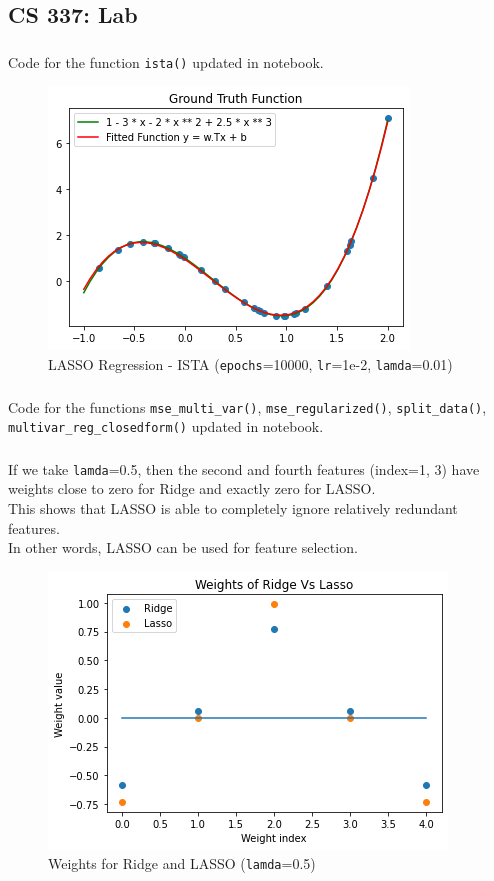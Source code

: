 \documentclass[12pt, fleqn]{article}
\begin{document}
\subsection{CS 337: Lab}
\subsubsection{}
Code for the function \verb!ista()! updated in notebook.
\begin{figure}[H]
  \centering
  \includegraphics[scale=0.7]{lasso_0.01.png}
  \caption{LASSO Regression - ISTA (\texttt{epochs}=10000, \texttt{lr}=1e-2, \texttt{lamda}=0.01)}
\end{figure}

\subsubsection{}
Code for the functions \verb!mse_multi_var()!, \verb!mse_regularized()!, \verb!split_data()!, \\ \verb!multivar_reg_closedform()! updated in notebook.

\subsubsection{}
If we take \texttt{lamda}=0.5, then the second and fourth features (index=1, 3) have weights close to zero for Ridge and exactly zero for LASSO. \\
This shows that LASSO is able to completely ignore relatively redundant features. \\
In other words, LASSO can be used for feature selection.

\begin{figure}[H]
  \centering
  \includegraphics[scale=0.7]{weights_0.5.png}
  \caption{Weights for Ridge and LASSO (\texttt{lamda}=0.5)}
\end{figure}
\end{document}
